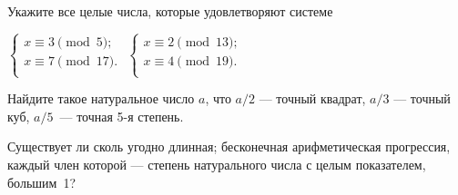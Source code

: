 \documentclass[a4paper,12pt]{article}
\begin{document}
 Укажите все целые числа, которые удовлетворяют системе

{ $  \left\{
\begin{array}{l}
x \equiv 3 \pmod{5};  \\[4pt]
x \equiv 7 \pmod{17}.  \\[4pt]
\end{array}
\right. $}
{ $  \left\{
\begin{array}{l}
x \equiv 2 \pmod{13};  \\[4pt]
x \equiv 4 \pmod{19}.  \\[4pt]
\end{array}
\right. $}



Найдите такое натуральное число $a$, что $a/2$ --- точный квадрат, $a/3$ --- точный куб, $a/5$~--- точная 5-я степень.


Существует ли
сколь угодно длинная;
бесконечная арифметическая прогрессия, каждый член которой --- степень
натурального числа с целым показателем, большим~1?

\end{document}
